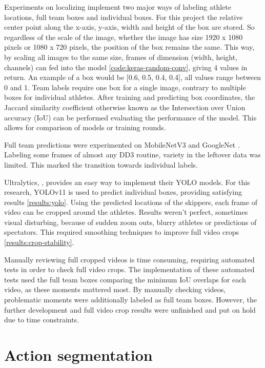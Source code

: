 Experiments on localizing implement two major ways of labeling athlete locations, full team boxes and individual boxes.
For this project the relative center point along the x-axis, y-axis, width and height of the box are stored. So regardless of the scale of the image, whether the image has size 1920 x 1080 pixels or 1080 x 720 pixels, the position of the box remains the same.
This way, by scaling all images to the same size, frames of dimension (width, height, channels) can fed into the model \ref{code:keras-random-conv}, giving 4 values in return. An example of a box would be [0.6, 0.5, 0.4, 0.4], all values range between 0 and 1.
Team labels require one box for a single image, contrary to multiple boxes for individual athletes. 
After training and predicting box coordinates, the Jaccard similarity coefficient otherwise known as the Intersection over Union accuracy (IoU) can be performed evaluating the performance of the model. This allows for comparison of models or training rounds.

Full team predictions were experimented on MobileNetV3 \autocite{Howard2019} and GoogleNet \autocite{Szegedy2014}. Labeling some frames of almost any DD3 routine, variety in the leftover data was limited. This marked the transition towards individual labels.

Ultralytics, \autocite{Khanam2024}, provides an easy way to implement their YOLO models. For this research, YOLOv11 is used to predict individual boxes, providing satisfying results \ref{results:yolo}. 
Using the predicted locations of the skippers, each frame of video can be cropped around the athletes. Results weren't perfect, sometimes visual disturbing, because of sudden zoom outs, blurry athletes or predictions of spectators. This required smoothing techniques to improve full video crops \ref{results:crop-stability}.

Manually reviewing full cropped videos is time consuming, requiring automated tests in order to check full video crops. The implementation of these automated tests used the full team boxes comparing the minimum IoU overlaps for each video, as these moments mattered most. By manually checking videos, problematic moments were additionally labeled as full team boxes. However, the further development and full video crop results were unfinished and put on hold due to time constraints. 

\section{Action segmentation}
\label{methodology:action-segmentation}

